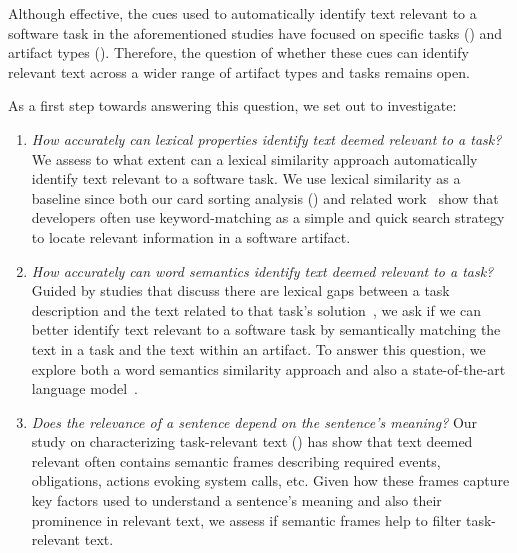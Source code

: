 Although effective, the cues used to automatically identify text relevant to a software task in the aforementioned studies have focused on specific tasks () and artifact types ().
Therefore, the question of whether these cues can identify relevant text across a wider range of artifact types and tasks remains open. 



As a first step towards answering this question, we set out to investigate:


\begin{enumerate}
    \item \textit{How accurately can lexical properties identify text deemed relevant to a task?}
    We assess to what extent can a lexical similarity approach automatically identify text relevant to a software task.
    We use lexical similarity as a baseline since both our card sorting analysis () and related work~\cite{Ko2006a, Freund2015} show
    that developers often use keyword-matching as a simple and quick search strategy to locate relevant information in a software artifact.


    \item \textit{How accurately can word semantics identify text deemed relevant to a task?}
    Guided by studies that discuss there are lexical gaps between a task description and the text related to that task's solution~\cite{silva2019, Huang2018, Ye2016},
    we ask if we can better identify text relevant to a software task by semantically matching the text in a task and the text within an artifact.
    To answer this question, we explore both a word semantics similarity approach and also a state-of-the-art language model~\cite{Devlin2018Bert}.

    
    \item \textit{Does the relevance of a sentence depend on the sentence's meaning?}
    Our study on characterizing task-relevant text () has show that text deemed relevant often contains semantic frames describing 
     required events, obligations, actions evoking system calls, etc.
    Given how these frames capture key factors used to understand a sentence's meaning
    and also their prominence in relevant text, 
    we assess if semantic frames help to filter task-relevant text.
\end{enumerate}




